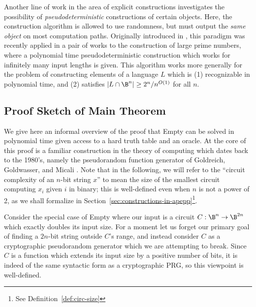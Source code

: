 Another line of work in the area of explicit constructions investigates the possibility of \emph{pseudodeterministic} constructions of certain objects. Here, the construction algorithm is allowed to use randomness, but must output the \emph{same object} on most computation paths. Originally introduced in \cite{GG}, this paradigm was recently applied in a pair of works \cite{pseudo-primes, poly-time-primes} to the construction of large prime numbers, where a polynomial time pseudodeterministic construction which works for infinitely many input lengths is given. This algorithm works more generally for the problem of constructing elements of a language $L$ which is (1) recognizable in polynomial time, and (2) satisfies $|L \cap \B^n| \geq 2^n/n^{O(1)}$ for all $n$.

\subsection{Proof Sketch of Main Theorem}
We give here an informal overview of the proof that {\sc Empty} can be solved in polynomial time given access to a hard truth table and an  oracle. At the core of this proof is a familiar construction in the theory of computing which dates back to the 1980's, namely the pseudorandom function generator of Goldreich, Goldwasser, and Micali \cite{GGM}. Note that in the following, we will refer to the ``circuit complexity of an $n$-bit string $x$'' to mean the size of the smallest circuit computing $x_i$ given $i$ in binary; this is well-defined even when $n$ is not a power of 2, as we shall formalize in Section~\ref{sec:constructions-in-apepp}\footnote{See Definition~\ref{def:circ-size}}.

Consider the special case of {\sc Empty} where our input is a circuit $C: \B^n \rightarrow \B^{2n}$ which exactly doubles its input size. For a moment let us forget our primary goal of finding a $2n$-bit string outside $C$'s range, and instead consider $C$ as a cryptographic pseudorandom generator which we are attempting to break. Since $C$ is a function which extends its input size by a positive number of bits, it is indeed of the same syntactic form as a cryptographic PRG, so this viewpoint is well-defined.

